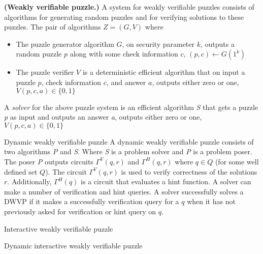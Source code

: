 \begin{definition} {\textbf{(Weakly verifiable puzzle.)}}
A system for weakly verifiable puzzles consists of algorithms for generating random puzzles and for verifying solutions to these puzzles. The pair of algorithms $Z = (G,V)$ where
\begin{itemize}
\item
  The puzzle generator algorithm $G$, on security parameter $k$, outputs a random puzzle $p$
  along with some check information $c$, $(p,c) \leftarrow G(1^k)$

\item
  The puzzle verifier $V$ is a deterministic efficient algorithm that on input a puzzle $p$,
  check information $c$, and answer  $a$, outputs either zero or one, $V(p,c,a) \in \{0,1\}$
\end{itemize}

A \textit{solver} for the above puzzle system is an efficient algorithm \textit{S} that gets a puzzle \textit{p} as input and outputs an answer \textit{a}, outputs either zero or one,
$V(p,c,a) \in \{0,1\}$
\end{definition}

\begin{definition} {Dynamic weakly verifiable puzzle}
A dynamic weakly verifiable puzzle consists of two algorithms \textit{P} and \textit{S}. Where \textit{S} is a problem solver and \textit{P} is a problem poser.
The poser \textit{P} outputs circuits $\Gamma^{V}(q,r)$ and $\Gamma^{H}(q,r)$ where $q \in Q$ (for some well defined set $Q$). The circuit $\Gamma^{V}(q,r)$ is used to verify
correctness of the solutions $r$. Additionally, $\Gamma^{H}(q)$ is a circuit that evaluates a hint function.
A solver can make a number of verification and hint queries.
A solver successfully solves a DWVP if it makes a successfully verification query for a $q$ when
it has not previously asked for verification or hint query on $q$.


\end{definition}

\begin{definition} {Interactive weakly verifiable puzzle}

\end{definition}

\begin{definition} {Dynamic interactive weakly verifiable puzzle}

\end{definition}





